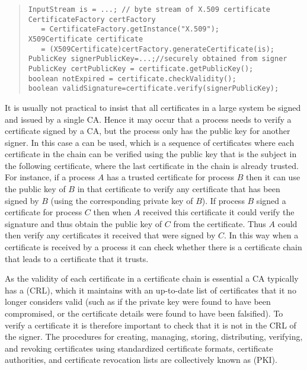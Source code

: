 \begin{quote}\begin{code}\begin{verbatim}
InputStream is = ...; // byte stream of X.509 certificate
CertificateFactory certFactory
   = CertificateFactory.getInstance("X.509");
X509Certificate certificate
   = (X509Certificate)certFactory.generateCertificate(is);
PublicKey signerPublicKey=...;//securely obtained from signer
PublicKey certPublicKey = certificate.getPublicKey();
boolean notExpired = certificate.checkValidity();
boolean validSignature=certificate.verify(signerPublicKey);
\end{verbatim}\end{code}\end{quote}

It is usually not practical to insist that all certificates in a large system
be signed and issued by a single CA. Hence it may occur that a process needs to verify
a certificate signed by a CA, but the process only has the public key for another
signer. In this case a  can be used, which is a sequence
of certificates where each certificate in the chain can be verified using the public key
that is the subject in the following certificate,
where the last certificate in the chain is already trusted.
For instance, if a process $A$ has a trusted certificate for process $B$
then it can use the public key of $B$ in that certificate to verify any certificate
that has been signed by $B$ (using the corresponding private key of $B$).
If process $B$ signed a certificate for process $C$ then when $A$ received this certificate
it could verify the signature and thus obtain the public key of $C$ from the certificate.
Thus $A$ could then verify any certificates it received that were signed by $C$.
In this way when a certificate is received by a process it can check whether there
is a certificate chain that leads to a certificate that it trusts.

As the validity of each certificate in a certificate chain is essential
a CA typically has a  (CRL),
which it maintains with an up-to-date list of certificates that it no longer considers
valid (such as if the private key were found to have been compromised,
or the certificate details were found to have been falsified).
To verify a certificate it is therefore important to check that it is not
in the CRL of the signer.
The procedures for creating, managing, storing, distributing, verifying,
and revoking certificates
using standardized certificate formats, certificate authorities, and
certificate revocation lists are collectively known as
 (PKI).

